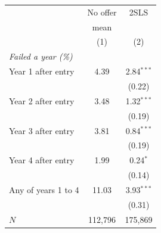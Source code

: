 \begin{tabular}{lcc}
\toprule
 & No offer & 2SLS\\
 & mean & \\
 & (1) & (2)\\
\midrule
\multicolumn{3}{l}{\textit{Failed a year (\%)}}\\
Year 1 after entry & 4.39 & 2.84$^{***}$\\
 &  & (0.22)\\
Year 2 after entry & 3.48 & 1.32$^{***}$\\
 &  & (0.19)\\
Year 3 after entry & 3.81 & 0.84$^{***}$\\
 &  & (0.19)\\
Year 4 after entry & 1.99 & 0.24$^{*}$\\
 &  & (0.14)\\
Any of years 1 to 4 & 11.03 & 3.93$^{***}$\\
 &  & (0.31)\\
\midrule
$N$ & 112,796 & 175,869\\
\bottomrule
\end{tabular}
